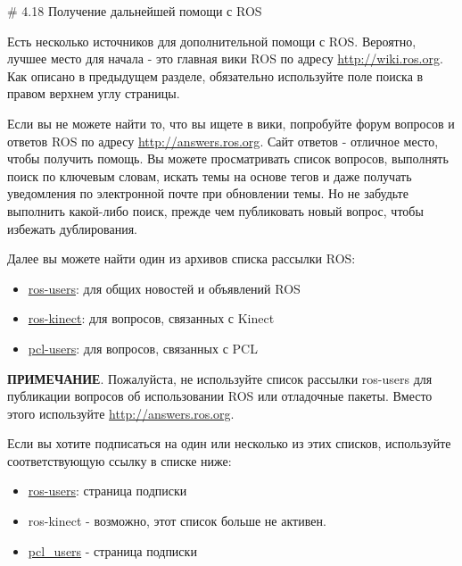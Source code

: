 # 4.18 Получение дальнейшей помощи с ROS


Есть несколько источников для дополнительной помощи с ROS. Вероятно, лучшее место для начала - это главная вики ROS по адресу \href{http://wiki.ros.org}{http://wiki.ros.org}. Как описано в предыдущем разделе, обязательно используйте поле поиска в правом верхнем углу страницы.

 Если вы не можете найти то, что вы ищете в вики, попробуйте форум вопросов и ответов ROS по адресу \href{http://answers.ros.org}{http://answers.ros.org}. Сайт ответов - отличное место, чтобы получить помощь. Вы можете просматривать список вопросов, выполнять поиск по ключевым словам, искать темы на основе тегов и даже получать уведомления по электронной почте при обновлении темы. Но не забудьте выполнить какой-либо поиск, прежде чем публиковать новый вопрос, чтобы избежать дублирования.

Далее вы можете найти один из архивов списка рассылки ROS: 

\begin{itemize} 
\item { \href{http://code.ros.org/lurker/list/ros-users.html}{ros-users}: для общих новостей и объявлений ROS} 
\item { \href{http://kinect-with-ros.976505.n3.nabble.com/}{ros-kinect}: для вопросов, связанных с Kinect} 
\item { \href{http://www.pcl-users.org/}{pcl-users}: для вопросов, связанных с PCL} 
\end{itemize} 

\textbf{ПРИМЕЧАНИЕ}. Пожалуйста, не используйте список рассылки ros-users для публикации вопросов об использовании ROS или отладочные пакеты. Вместо этого используйте \href{http://answers.ros.org}{http://answers.ros.org}. 

Если вы хотите подписаться на один или несколько из этих списков, используйте соответствующую ссылку в списке ниже:

\begin{itemize} 
\item { \href{http://lists.ros.org/mailman/listinfo/ros-users}{ros-users}: страница подписки } 
\item {  ros-kinect - возможно, этот список больше не активен.} 
\item {  \href{%20http://pointclouds.org/mailman/listinfo/pcl-users}{pcl\_users} - страница подписки} 
\end{itemize} 



